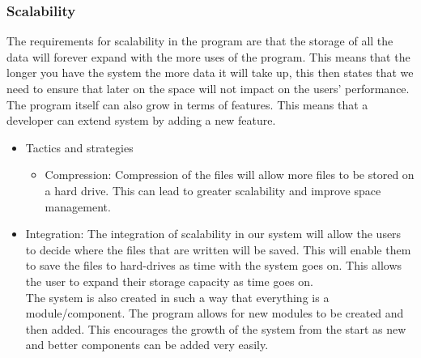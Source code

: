 
%

\subsubsection{Scalability}
\begin{flushleft}
The requirements for scalability in the program are that the storage of all the data will forever expand with the more uses of the program. This means that the longer you have the system the more data it will take up, this then states that we need to ensure that later on the space will not impact on the users' performance. The program itself can also grow in terms of features. This means that a developer can extend system by adding a new feature.
\begin{itemize}
\item{Tactics and strategies}
\begin{itemize}
\item{Compression}: Compression of the files will allow more files to be stored on a hard drive. This can lead to greater scalability and improve space management.
\end{itemize}

\item{Integration}: The integration of scalability in our system will allow the users to decide where the files that are written will be saved. This will enable them to save the files to hard-drives as time with the system goes on. This allows the user to expand their storage capacity as time goes on.\\
The system is also created in such a way that everything is a module/component. The program allows for new modules to be created and then added. This encourages the growth of the system from the start as new and better components can be added very easily.
\end{itemize}

\end{flushleft}
		
